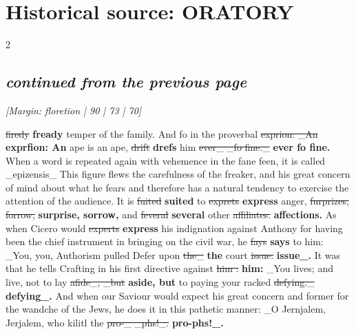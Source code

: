 \documentclass[10pt]{article}
\begin{document}
\section*{Historical source: ORATORY}
\begin{multicols}{2}
\subsection*{\textit{continued from the previous page}}
{\small\itshape [Margin: floretion | 90 | 73 | 70]}\par
\sout{firedy} \textbf{fready} temper of the family. And fo in the proverbal \sout{exprion: \_An} \textbf{exprfion: An} ape is an ape, \sout{drift} \textbf{drefs} him \sout{ever\_ \_fo fine.\_} \textbf{ever fo fine.} When a word is repeated again with vehemence in the fane feen, it is called \_epizensis\_ This figure flews the carefulness of the freaker, and his great concern of mind about what he fears and therefore has a natural tendency to exercise the attention of the audience. It is \sout{fuited} \textbf{suited} to \sout{exprets} \textbf{express} anger, \sout{furprizes, forrow,} \textbf{surprise, sorrow,} and \sout{feveral} \textbf{several} other \sout{affiliates.} \textbf{affections.} As when Cicero would \sout{experts} \textbf{express} his indignation against Anthony for having been the chief instrument in bringing on the civil war, he \sout{fays} \textbf{says} to him: \_You, you, Authorism pulled Defer upon \sout{the\_} \textbf{the} court \sout{issue.} \textbf{issue\_.} It was that he tells Crafting in his first directive against \sout{him :} \textbf{him:} \_You lives; and live, not to lay \sout{afide\_, \_but} \textbf{aside, but} to paying your racked \sout{defying.\_} \textbf{defying\_.} And when our Saviour would expect his great concern and former for the wandche of the Jews, he does it in this pathetic manner: \_O Jernjalem, Jerjalem, who kilitl the \sout{pro-\_ \_phs!\_.} \textbf{pro-phs!\_.}


\end{multicols}
\end{document}
